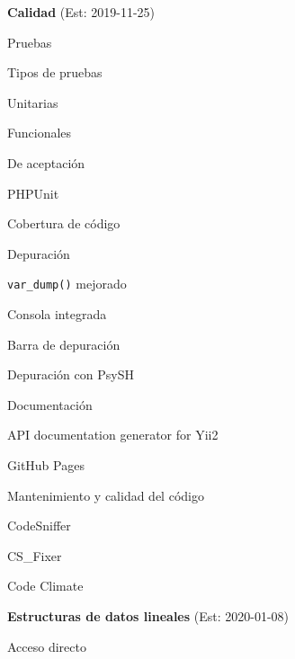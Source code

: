 \begin{longenum}
    \item \textbf{Calidad}  (Est: 2019-11-25)
    \begin{longenum}
        \item Pruebas
        \begin{longenum}
            \item Tipos de pruebas
            \begin{longenum}
                \item Unitarias
                \item Funcionales
                \item De aceptación
            \end{longenum}
            \item PHPUnit
            \item Cobertura de código \opcional
        \end{longenum}
        \item Depuración
        \begin{longenum}
            \item \texttt{var\_dump()} mejorado
            \item Consola integrada
            \item Barra de depuración
            \item Depuración con PsySH \opcional
        \end{longenum}
        \item Documentación
        \begin{longenum}
            \item API documentation generator for Yii2
            \item GitHub Pages
        \end{longenum}
        \item Mantenimiento y calidad del código
        \begin{longenum}
            \item CodeSniffer
            \item CS\_Fixer
            \item Code Climate
        \end{longenum}
    \end{longenum}
    \item \textbf{Estructuras de datos lineales}  (Est: 2020-01-08)
    \begin{longenum}
        \item Acceso directo
        \begin{longenum}

\end{longenum}
\end{longenum}
\end{longenum}
